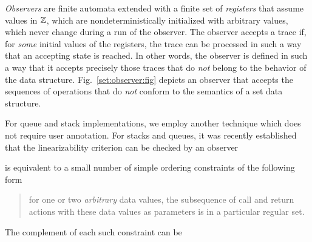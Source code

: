 {\em Observers} are
finite automata extended with a finite set of {\em registers}
that assume values in ${\mathbb Z}$, which are 
nondeterministically initialized with arbitrary values, which never change
during a run of the observer. 
The observer accepts a trace if, for {\em some} initial values of the
registers, the trace can  be processed in such a way that
an accepting state is reached.
In other words, the observer is defined in such a way that it accepts precisely those
traces that do {\em not} belong to the behavior
of the data structure.
%
%
Fig.~\ref{set:observer:fig}
depicts an observer that accepts the
sequences of operations that do {\em not} conform to the semantics of a set
data structure.



For queue and stack implementations, we employ another technique which does
not require user annotation.
For stacks and queues, it was recently established
~\cite{BEEH:icalp15,HSV:concur13} that the linearizability criterion can be
checked by an observer

is equivalent to
a small number of simple ordering constraints of the following form
\begin{quote}
for one or two {\em arbitrary} data values, the subsequence of
call and return actions with these data values as parameters is in 
a particular regular set.
\end{quote}
The complement of each such constraint can be

